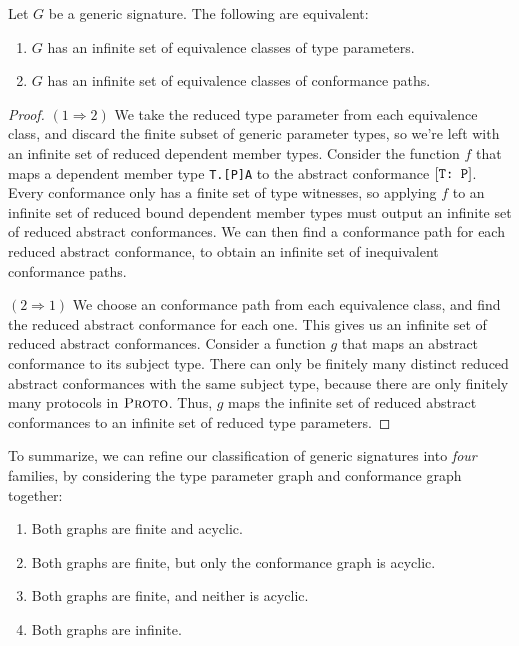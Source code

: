 \documentclass[../generics]{subfiles}
\begin{document}
\begin{proposition}\label{infinite signature lemma} Let $G$ be a generic signature. The following are equivalent:
\begin{enumerate}
\item $G$ has an infinite set of equivalence classes of type parameters.
\item $G$ has an infinite set of equivalence classes of conformance paths.
\end{enumerate}
\end{proposition}
\begin{proof}
$(1 \Rightarrow 2)$ We take the reduced type parameter from each equivalence class, and discard the finite subset of generic parameter types, so we're left with an infinite set of reduced dependent member types. Consider the function $f$ that maps a dependent member type \texttt{T.[P]A} to the abstract conformance $[\texttt{T:~P}]$. Every conformance only has a finite set of type witnesses, so applying $f$ to an infinite set of reduced bound dependent member types must output an infinite set of reduced abstract conformances. We can then find a conformance path for each reduced abstract conformance, to obtain an infinite set of inequivalent conformance paths.

$(2 \Rightarrow 1)$ We choose an conformance path from each equivalence class, and find the reduced abstract conformance for each one. This gives us an infinite set of reduced abstract conformances. Consider a function $g$ that maps an abstract conformance to its subject type. There can only be finitely many distinct reduced abstract conformances with the same subject type, because there are only finitely many protocols in $\textsc{Proto}$. Thus, $g$ maps the infinite set of reduced abstract conformances to an infinite set of reduced type parameters.
\end{proof}

To summarize, we can refine our classification of generic signatures into \emph{four} families, by considering the type parameter graph and conformance graph together:
\begin{enumerate}
\item Both graphs are finite and acyclic.
\item Both graphs are finite, but only the conformance graph is acyclic.
\item Both graphs are finite, and neither is acyclic.
\item Both graphs are infinite.
\end{enumerate}
\end{document}
